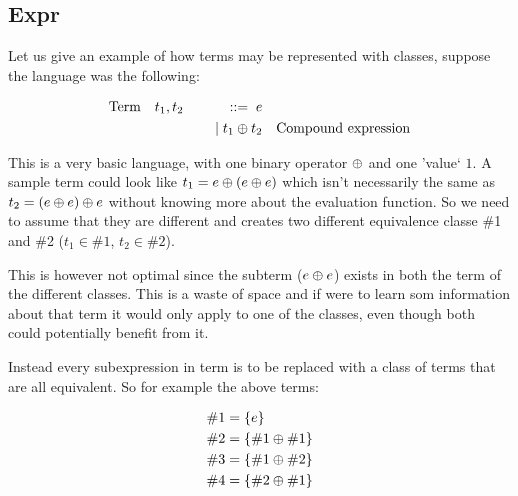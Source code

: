 




\subsection{Expr}


Let us give an example of how terms may be represented with classes, suppose the
language was the following:

\begin{equation*}
\begin{aligned}
\text{Term} \quad & t_1,t_2 \quad & ::= \; e & \\
 & & \; | \; t_1 \oplus t_2  & \quad \text{Compound expression} \\
\end{aligned}
\end{equation*}

This is a very basic language, with one binary operator $\oplus$ and one 'value` $1$. 
A sample term could look like
$t_1 = e \oplus (e \oplus e)$
which isn't necessarily the same as 
$t_2 = (e \oplus e) \oplus e$
without knowing more about the evaluation function.
So we need to assume that they are different and creates two different equivalence
classe \#1 and \#2 ($t_1 \in \#1$, $t_2 \in \#2$).

This is however not optimal since the subterm ($e \oplus e$) exists
in both the term of the different classes. This is a waste of space and if were to
learn som information about that term it would only apply to one of the classes,
even though both could potentially benefit from it. 


Instead every subexpression in term is to be replaced with a class of terms that are all equivalent.
So for example the above terms:

\begin{equation*}
\begin{aligned}
\#1 & = \{e\} \\
\#2 &= \{\#1 \oplus \#1\} \\
\#3 &= \{ \#1 \oplus \#2\} \\
\#4 &= \{ \#2 \oplus \#1\}
\end{aligned}
\end{equation*}

